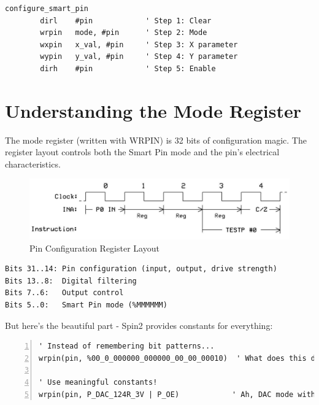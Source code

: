 \documentclass[11pt,a4paper,oneside,english]{book}
\begin{document}
\begin{PASM2Block}
\begin{lstlisting}
configure_smart_pin
        dirl    #pin            ' Step 1: Clear
        wrpin   mode, #pin      ' Step 2: Mode
        wxpin   x_val, #pin     ' Step 3: X parameter
        wypin   y_val, #pin     ' Step 4: Y parameter
        dirh    #pin            ' Step 5: Enable
\end{lstlisting}
\end{PASM2Block}

\hypertarget{understanding-the-mode-register}{%
\section{Understanding the Mode
Register}\label{understanding-the-mode-register}}

The mode register (written with WRPIN) is 32 bits of configuration
magic. The register layout controls both the Smart Pin mode and the
pin's electrical characteristics.

\begin{figure}
\centering
\includegraphics{assets/P2 SmartPins-220809_page04_img02.png}
\caption{Pin Configuration Register Layout}
\end{figure}

\begin{lstlisting}
Bits 31..14: Pin configuration (input, output, drive strength)
Bits 13..8:  Digital filtering
Bits 7..6:   Output control
Bits 5..0:   Smart Pin mode (%MMMMMM)
\end{lstlisting}

But here's the beautiful part - Spin2 provides constants for everything:

\begin{Spin2Block}
\begin{Verbatim}[numbers=left,numbersep=5pt,xleftmargin=15pt]
' Instead of remembering bit patterns...
wrpin(pin, %00_0_000000_000000_00_00_00010)  ' What does this do?!

' Use meaningful constants!
wrpin(pin, P_DAC_124R_3V | P_OE)            ' Ah, DAC mode with output!
\end{Verbatim}
\end{Spin2Block}
\end{document}
